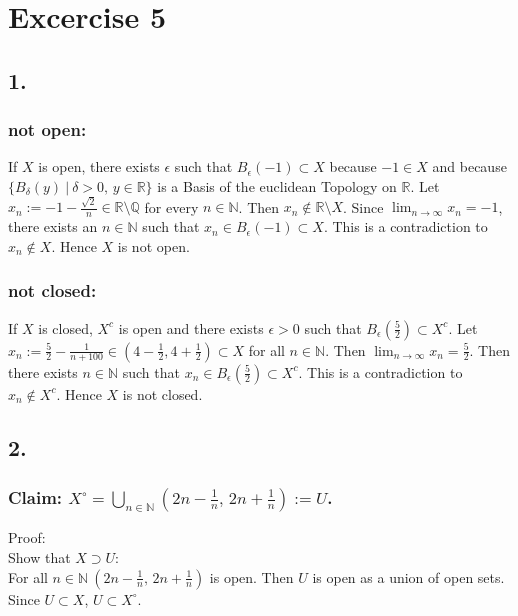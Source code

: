 \documentclass{article}
\begin{document}
\section*{Excercise 5}
\subsection*{1.}
\subsubsection*{not open:}
If $X$ is open, there exists $\epsilon$ such that $B_{\epsilon}(-1) \subset X$ because $-1 \in X$ and because $\{ B_{\delta}(y) \ | \ \delta > 0 ,\, y \in \mathbb{R}\}$ is a Basis of the euclidean Topology on $\mathbb{R}$.
Let $x_{n} := -1 - \frac{\sqrt{2}}{n} \in \mathbb{R} \setminus \mathbb{Q}$ for every $n \in \mathbb{N}$.
Then $x_{n} \notin \mathbb{R} \setminus X$. 
Since $\lim_{n \rightarrow \infty} x_{n} = -1$, there exists an $n \in \mathbb{N}$ such that $x_{n} \in B_{\epsilon}(-1) \subset X$.
This is a contradiction to $x_{n} \notin X$.
Hence $X$ is not open.

\subsubsection*{not closed:}
If $X$ is closed, $X^{c}$ is open and there exists $\epsilon > 0$ such that $B_{\epsilon}(\frac{5}{2}) \subset X^{c}$.
Let $x_{n} := \frac{5}{2}-\frac{1}{n+100} \in (4 - \frac{1}{2}, 4 + \frac{1}{2}) \subset X$ for all $n \in \mathbb{N}$.
Then $\lim_{n \rightarrow \infty} x_{n} = \frac{5}{2}$.
Then there exists $n \in \mathbb{N}$ such that $x_{n} \in B_{\epsilon}(\frac{5}{2}) \subset X^{c}$.
This is a contradiction to $x_{n} \notin X^{c}$.
Hence $X$ is not closed.

\subsection*{2.}
\subsubsection*{Claim: $X^{\circ}= \bigcup_{n \in \mathbb{N} } (2n - \frac{1}{n} ,\, 2n + \frac{1}{n}):= U$.}
Proof: \\
Show that $X \supset U$: \\
For all $n \in \mathbb{N} \ (2n - \frac{1}{n} ,\, 2n + \frac{1}{n})$ is open. Then $U$ is open as a union of open sets. Since $U \subset X$, $U \subset X^{\circ}$.
\end{document}
